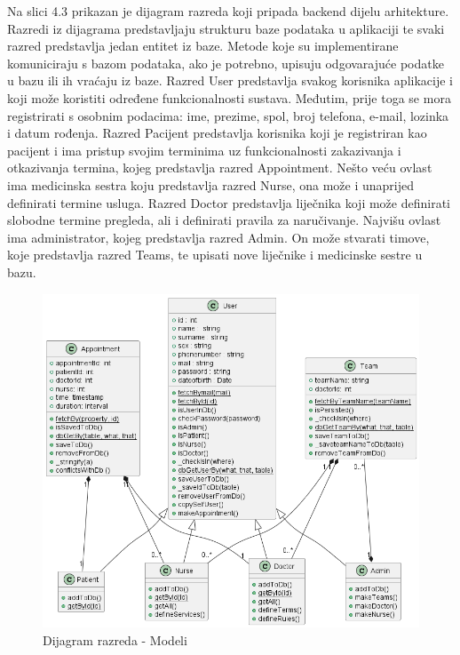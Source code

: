 			Na slici 4.3 prikazan je dijagram razreda koji pripada backend dijelu arhitekture. Razredi iz dijagrama predstavljaju strukturu baze podataka u aplikaciji te svaki razred predstavlja jedan entitet iz baze. Metode koje su implementirane komuniciraju s bazom podataka, ako je potrebno, upisuju odgovarajuće podatke u bazu ili ih vraćaju iz baze. Razred User predstavlja svakog korisnika aplikacije i koji može koristiti određene funkcionalnosti sustava. Međutim, prije toga se mora registrirati s osobnim podacima: ime, prezime, spol, broj telefona, e-mail, lozinka i datum rođenja. Razred Pacijent predstavlja korisnika koji je registriran kao pacijent i ima pristup svojim terminima uz funkcionalnosti zakazivanja i otkazivanja termina, kojeg predstavlja razred Appointment. Nešto veću ovlast ima medicinska sestra koju predstavlja razred Nurse, ona može i unaprijed definirati termine usluga. Razred Doctor predstavlja liječnika koji može definirati slobodne termine pregleda, ali i definirati pravila za naručivanje. Najvišu ovlast ima administrator, kojeg predstavlja razred Admin. On može stvarati timove, koje predstavlja razred Teams, te upisati nove liječnike i medicinske sestre u bazu.
			
			\begin{figure}[H]
			            \includegraphics[width=\textwidth]{slike/backend_class_diagram.png} %
			            \caption{Dijagram razreda - Modeli}
			            \label{fig:promjene2} %
		      \end{figure}
		      
